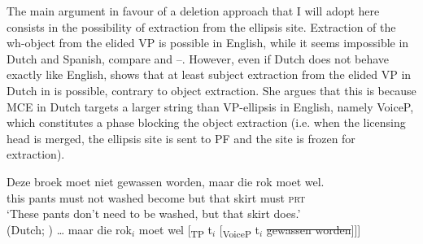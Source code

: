 \documentclass[output=paper,colorlinks,citecolor=brown,
modfonts
]{langscibook}
\begin{document}
\noindent The main argument in favour of a deletion approach that I will adopt here consists in the possibility of extraction from the ellipsis site. Extraction of the wh-object from the elided VP is possible in English, while it seems impossible in Dutch and Spanish, compare  and --. However, even if Dutch does not behave exactly like English, \cite{Aelbrecht2008,Aelbrecht2010} shows that at least subject extraction from the elided VP in Dutch in  is possible, contrary to object extraction. She argues that this is because MCE in Dutch targets a larger string than VP-ellipsis in English, namely VoiceP, which constitutes a phase blocking the object extraction (i.e. when the licensing head is merged, the ellipsis site is sent to PF and the site is frozen for extraction).

\begin{exe}
\ex 
\begin{xlist}
\end{xlist}
\ex  \label{7}
\begin{xlist}
\ex 
\gll Deze broek moet niet gewassen worden, maar die rok moet wel.\\
this pants must not  washed become but that skirt must \textsc{prt} \\
\glt  `These pants don't need to be washed, but that skirt does.' \\ \hfill (Dutch; \citealt{Aelbrecht2010})
\ex 
{\ldots} maar die rok$_{i}$ moet wel [\textsubscript{TP} t$_{i}$ [\textsubscript{VoiceP} t$_{i}$ \sout{gewassen worden}]]]
\end{xlist}
\end{exe}
\end{document}
